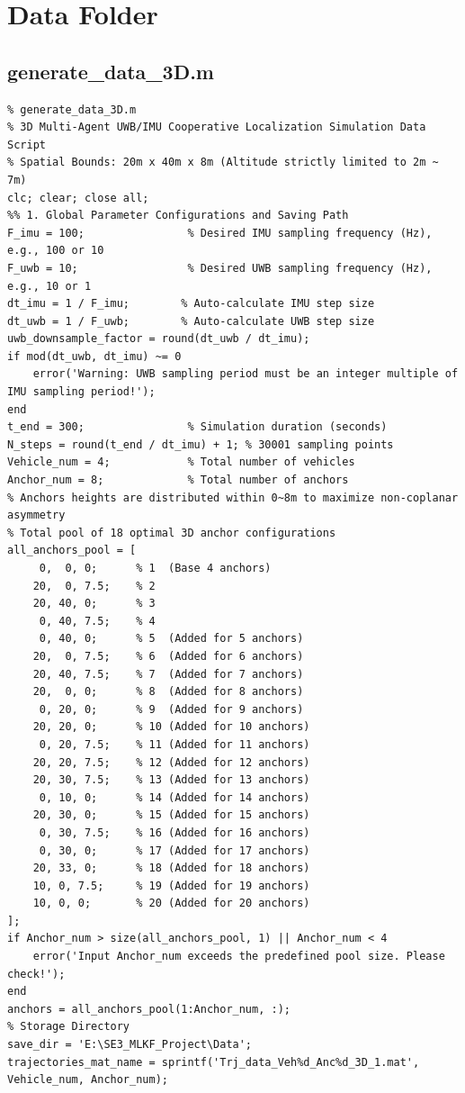 \documentclass[twocolumn,10pt]{article}
\begin{document}
\section{Data Folder}

\subsection{generate\_data\_3D.m}
\begin{lstlisting}
% generate_data_3D.m 
% 3D Multi-Agent UWB/IMU Cooperative Localization Simulation Data Script
% Spatial Bounds: 20m x 40m x 8m (Altitude strictly limited to 2m ~ 7m)
clc; clear; close all;
%% 1. Global Parameter Configurations and Saving Path
F_imu = 100;                % Desired IMU sampling frequency (Hz), e.g., 100 or 10
F_uwb = 10;                 % Desired UWB sampling frequency (Hz), e.g., 10 or 1
dt_imu = 1 / F_imu;        % Auto-calculate IMU step size
dt_uwb = 1 / F_uwb;        % Auto-calculate UWB step size
uwb_downsample_factor = round(dt_uwb / dt_imu); 
if mod(dt_uwb, dt_imu) ~= 0
    error('Warning: UWB sampling period must be an integer multiple of IMU sampling period!');
end
t_end = 300;                % Simulation duration (seconds)
N_steps = round(t_end / dt_imu) + 1; % 30001 sampling points
Vehicle_num = 4;            % Total number of vehicles
Anchor_num = 8;             % Total number of anchors
% Anchors heights are distributed within 0~8m to maximize non-coplanar asymmetry
% Total pool of 18 optimal 3D anchor configurations
all_anchors_pool = [
     0,  0, 0;      % 1  (Base 4 anchors)
    20,  0, 7.5;    % 2
    20, 40, 0;      % 3
     0, 40, 7.5;    % 4
     0, 40, 0;      % 5  (Added for 5 anchors)
    20,  0, 7.5;    % 6  (Added for 6 anchors)
    20, 40, 7.5;    % 7  (Added for 7 anchors)
    20,  0, 0;      % 8  (Added for 8 anchors)
     0, 20, 0;      % 9  (Added for 9 anchors)
    20, 20, 0;      % 10 (Added for 10 anchors)
     0, 20, 7.5;    % 11 (Added for 11 anchors)
    20, 20, 7.5;    % 12 (Added for 12 anchors)
    20, 30, 7.5;    % 13 (Added for 13 anchors)
     0, 10, 0;      % 14 (Added for 14 anchors)
    20, 30, 0;      % 15 (Added for 15 anchors)
     0, 30, 7.5;    % 16 (Added for 16 anchors)
     0, 30, 0;      % 17 (Added for 17 anchors)
    20, 33, 0;      % 18 (Added for 18 anchors)
    10, 0, 7.5;     % 19 (Added for 19 anchors)
    10, 0, 0;       % 20 (Added for 20 anchors)
];
if Anchor_num > size(all_anchors_pool, 1) || Anchor_num < 4
    error('Input Anchor_num exceeds the predefined pool size. Please check!');
end
anchors = all_anchors_pool(1:Anchor_num, :);
% Storage Directory
save_dir = 'E:\SE3_MLKF_Project\Data'; 
trajectories_mat_name = sprintf('Trj_data_Veh%d_Anc%d_3D_1.mat', Vehicle_num, Anchor_num);
   

\end{lstlisting}
\end{document}
